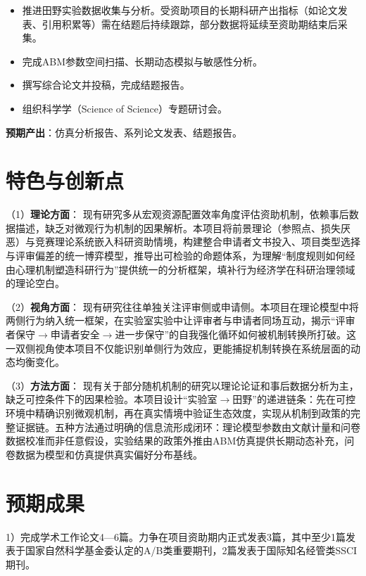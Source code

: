 \noindent\textbf{}
\begin{itemize}
\item 推进田野实验数据收集与分析。受资助项目的长期科研产出指标（如论文发表、引用积累等）需在结题后持续跟踪，部分数据将延续至资助期结束后采集。
\item 完成ABM参数空间扫描、长期动态模拟与敏感性分析。
\item 撰写综合论文并投稿，完成结题报告。
\item 组织科学学（Science of Science）专题研讨会。
\end{itemize}
\noindent\textbf{预期产出}：仿真分析报告、系列论文发表、结题报告。

\section{\textbf{特色与创新点}}

（1）\textbf{理论方面}： 现有研究多从宏观资源配置效率角度评估资助机制，依赖事后数据描述，缺乏对微观行为机制的因果解析。本项目将前景理论（参照点、损失厌恶）与竞赛理论系统嵌入科研资助情境，构建整合申请者文书投入、项目类型选择与评审偏差的统一博弈模型，推导出可检验的命题体系，为理解“制度规则如何经由心理机制塑造科研行为”提供统一的分析框架，填补行为经济学在科研治理领域的理论空白。

（2）\textbf{视角方面}： 现有研究往往单独关注评审侧或申请侧。本项目在理论模型中将两侧行为纳入统一框架，在实验室实验中让评审者与申请者同场互动，揭示“评审者保守$\to$申请者安全$\to$进一步保守”的自我强化循环如何被机制转换所打破。这一双侧视角使本项目不仅能识别单侧行为效应，更能捕捉机制转换在系统层面的动态均衡变化。

（3）\textbf{方法方面}： 现有关于部分随机机制的研究以理论论证和事后数据分析为主，缺乏可控条件下的因果检验。本项目设计“实验室$\to$田野”的递进链条：先在可控环境中精确识别微观机制，再在真实情境中验证生态效度，实现从机制到政策的完整证据链。五种方法通过明确的信息流形成闭环：理论模型参数由文献计量和问卷数据校准而非任意假设，实验结果的政策外推由ABM仿真提供长期动态补充，问卷数据为模型和仿真提供真实偏好分布基线。

\section{\textbf{预期成果}}

1）完成学术工作论文4—6篇。力争在项目资助期内正式发表3篇，其中至少1篇发表于国家自然科学基金委认定的A/B类重要期刊，2篇发表于国际知名经管类SSCI期刊。

